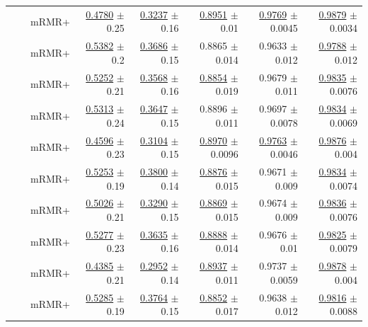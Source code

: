 \begin{longtable}{llp{}rrrrr}
 &  & mRMR+ & \underline{0.4780} {\scriptsize $\pm$ 0.25} & \underline{0.3237} {\scriptsize $\pm$ 0.16} & \underline{0.8951} {\scriptsize $\pm$ 0.01} & \underline{0.9769} {\scriptsize $\pm$ 0.0045} & \underline{0.9879} {\scriptsize $\pm$ 0.0034} \\
 &  & mRMR+ & \underline{0.5382} {\scriptsize $\pm$ 0.2} & \underline{0.3686} {\scriptsize $\pm$ 0.15} & 0.8865 {\scriptsize $\pm$ 0.014} & 0.9633 {\scriptsize $\pm$ 0.012} & \underline{0.9788} {\scriptsize $\pm$ 0.012} \\
 &  & mRMR+ & \underline{0.5252} {\scriptsize $\pm$ 0.21} & \underline{0.3568} {\scriptsize $\pm$ 0.16} & \underline{0.8854} {\scriptsize $\pm$ 0.019} & 0.9679 {\scriptsize $\pm$ 0.011} & \underline{0.9835} {\scriptsize $\pm$ 0.0076} \\
 &  & mRMR+ & \underline{0.5313} {\scriptsize $\pm$ 0.24} & \underline{0.3647} {\scriptsize $\pm$ 0.15} & 0.8896 {\scriptsize $\pm$ 0.011} & 0.9697 {\scriptsize $\pm$ 0.0078} & \underline{0.9834} {\scriptsize $\pm$ 0.0069} \\
 &  & mRMR+ & \underline{0.4596} {\scriptsize $\pm$ 0.23} & \underline{0.3104} {\scriptsize $\pm$ 0.15} & \underline{0.8970} {\scriptsize $\pm$ 0.0096} & \underline{0.9763} {\scriptsize $\pm$ 0.0046} & \underline{0.9876} {\scriptsize $\pm$ 0.004} \\
 &  & mRMR+ & \underline{0.5253} {\scriptsize $\pm$ 0.19} & \underline{0.3800} {\scriptsize $\pm$ 0.14} & \underline{0.8876} {\scriptsize $\pm$ 0.015} & 0.9671 {\scriptsize $\pm$ 0.009} & \underline{0.9834} {\scriptsize $\pm$ 0.0074} \\
 &  & mRMR+ & \underline{0.5026} {\scriptsize $\pm$ 0.21} & \underline{0.3290} {\scriptsize $\pm$ 0.15} & \underline{0.8869} {\scriptsize $\pm$ 0.015} & 0.9674 {\scriptsize $\pm$ 0.009} & \underline{0.9836} {\scriptsize $\pm$ 0.0076} \\
 &  & mRMR+ & \underline{0.5277} {\scriptsize $\pm$ 0.23} & \underline{0.3635} {\scriptsize $\pm$ 0.16} & \underline{0.8888} {\scriptsize $\pm$ 0.014} & 0.9676 {\scriptsize $\pm$ 0.01} & \underline{0.9825} {\scriptsize $\pm$ 0.0079} \\
 &  & mRMR+ & \underline{0.4385} {\scriptsize $\pm$ 0.21} & \underline{0.2952} {\scriptsize $\pm$ 0.14} & \underline{0.8937} {\scriptsize $\pm$ 0.011} & 0.9737 {\scriptsize $\pm$ 0.0059} & \underline{0.9878} {\scriptsize $\pm$ 0.004} \\
 &  & mRMR+ & \underline{0.5285} {\scriptsize $\pm$ 0.19} & \underline{0.3764} {\scriptsize $\pm$ 0.15} & \underline{0.8852} {\scriptsize $\pm$ 0.017} & 0.9638 {\scriptsize $\pm$ 0.012} & \underline{0.9816} {\scriptsize $\pm$ 0.0088} \\

\end{longtable}
